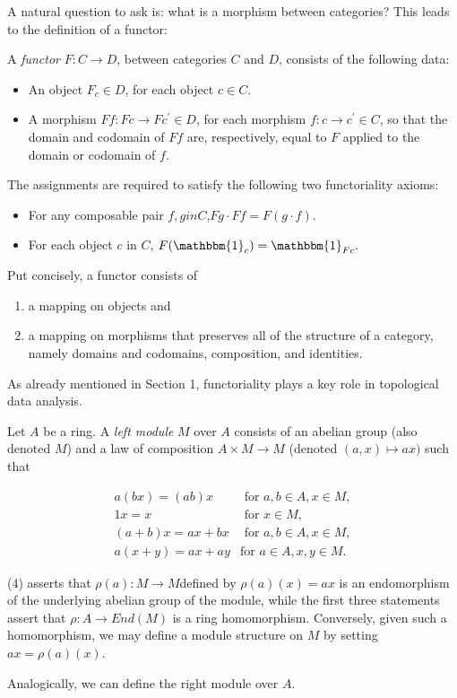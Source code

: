 \documentclass[11pt,reqno,oneside,a4paper]{article}
\begin{document}
A natural question to ask is: what is a morphism between categories? This leads to the definition of a functor:
\begin{defn}
	A \textit{functor} $F : C \to D$, between categories $C$ and $D$, consists of the following data:
	\begin{itemize}
		\item An object $F_c \in D$, for each object $c \in C$.
		\item A morphism $F f : Fc \to Fc^\prime \in D$, for each morphism $f : c \to c^\prime \in C$, so that the	domain and codomain of $F f$ are, respectively, equal to $F$ applied to the domain or codomain of $f$.
	\end{itemize}

	The assignments are required to satisfy the following two functoriality axioms:
	\begin{itemize}
		\item For any composable pair $f, g in C$,$Fg \cdot F f = F(g \cdot f).$
		\item For each object $c$ in $C$, $F(\mathbbm{1}_c) = \mathbbm{1}_{Fc}.$
	\end{itemize}

	Put concisely, a functor consists of 
	
	\begin{enumerate}
		\item a mapping on objects and 
		\item a mapping on morphisms that preserves all of the structure of a category, namely domains and codomains,	composition, and identities.
	\end{enumerate}
\end{defn}

As already mentioned in Section 1, functoriality plays a key role in topological data analysis.  

\cite{}

\begin{defn}
	Let $A$ be a ring. A \textit{left module} $M$ over $A$ consists of an abelian group (also denoted $M$) and a law of composition $A \times M \to M$ (denoted $(a, x) \mapsto ax)$ such that
	
	\begin{align}
	a(bx)=(ab)x &\text{ for }a, b \in A, x \in M, \\
	1x = x &\text{ for } x \in M,\\
	(a + b)x = ax + bx &\text{ for } a, b \in A, x \in M,\\
	a(x + y) = ax + ay &\text{for } a \in A, x, y \in M.
	\end{align}

	(4) asserts that $\rho(a) : M \to M $defined by $\rho(a)(x) = ax$ is an endomorphism of the	underlying abelian group of the module, while the first three statements assert that $\rho : A \to End(M)$
	is a ring homomorphism. Conversely, given such a homomorphism, we may define a module structure on $M$
	by setting $ax = \rho(a)(x)$.
	
	Analogically, we can define the right module over $A$.
\end{defn}
\end{document}
